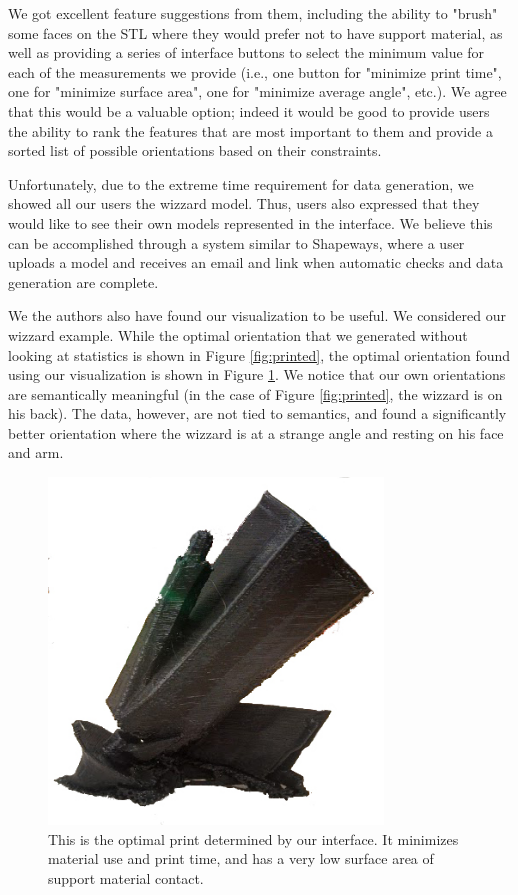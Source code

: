 \documentclass{sigchi}
\begin{document}
We got excellent feature suggestions from them, including the ability to "brush" some faces on the STL where they would prefer not to have support material, as well as providing a series of interface buttons to select the minimum value for each of the measurements we provide (i.e., one button for "minimize print time", one for "minimize surface area", one for "minimize average angle", etc.).  We agree that this would be a valuable option; indeed it would be good to provide users the ability to rank the features that are most important to them and provide a sorted list of possible orientations based on their constraints.

Unfortunately, due to the extreme time requirement for data generation, we showed all our users the wizzard model.  Thus, users also expressed that they would like to see their own models represented in the interface.  We believe this can be accomplished through a system similar to Shapeways, where a user uploads a model and receives an email and link when automatic checks and data generation are complete.

We the authors also have found our visualization to be useful.  We considered our wizzard example.  While the optimal orientation that we generated without looking at statistics is shown in Figure \ref{fig:printed}, the optimal orientation found using our visualization is shown in Figure \ref{fig:printedOptimal}.  We notice that our own orientations are semantically meaningful (in the case of Figure \ref{fig:printed}, the wizzard is on his back).  The data, however, are not tied to semantics, and found a significantly better orientation where the wizzard is at a strange angle and resting on his face and arm.

\begin{figure}
\centering
\includegraphics[width=3.5in]{images/printedOptimal.jpg}
\caption{This is the optimal print determined by our interface.  It minimizes material use and print time, and has a very low surface area of support material contact.}
\label{fig:printedOptimal}
\end{figure}
\end{document}
